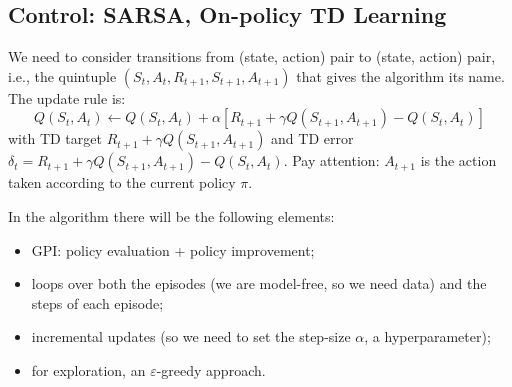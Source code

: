 \subsection{Control: SARSA, On-policy TD Learning}
We need to consider transitions from (state, action) pair to (state, action) pair, i.e., the quintuple $(S_t,A_t,R_{t+1},S_{t+1},A_{t+1})$ that gives the algorithm its name. The update rule is:
\[Q(S_t,A_t)\leftarrow Q(S_t,A_t)+\alpha\left[R_{t+1}+\gamma Q(S_{t+1},A_{t+1})-Q(S_t,A_t)\right]\]
with TD target $R_{t+1}+\gamma Q(S_{t+1},A_{t+1})$ and TD error $\delta_t=R_{t+1}+\gamma Q(S_{t+1},A_{t+1})-Q(S_t,A_t)$. Pay attention: $A_{t+1}$ is the action taken according to the current policy $\pi$.

\begin{figure}[htbp]
\centering
{}
\end{figure}

In the algorithm there will be the following elements:
\begin{itemize}
    \item GPI: policy evaluation + policy improvement;
    \item loops over both the episodes (we are model-free, so we need data) and the steps of each episode;
    \item incremental updates (so we need to set the step-size $\alpha$, a hyperparameter);
    \item for exploration, an $\varepsilon$-greedy approach.
\end{itemize}

